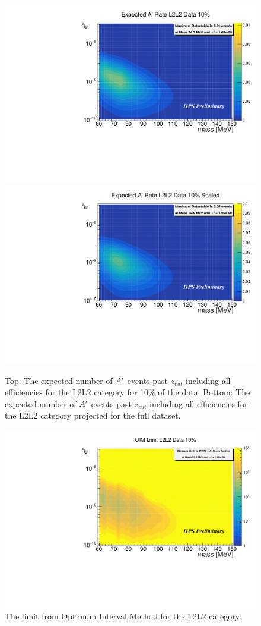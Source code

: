 \begin{figure}[t]
    \centering
\includegraphics[width=.85\textwidth]{figs/Results/ap_rate_L2L2.pdf}
    \includegraphics[width=.85\textwidth]{figs/Results/ap_rate_L2L2_scaled.pdf}
    \caption{Top: The expected number of $A^\prime$ events past $z_{cut}$ including all efficiencies for the L2L2 category for 10\% of the data. Bottom: The expected number of $A^\prime$ events past $z_{cut}$ including all efficiencies for the L2L2 category projected for the full dataset. }
    \label{fig:sigyield_L2L2}
\end{figure}

\begin{figure}[t]
    \centering
    \includegraphics[width=.85\textwidth]{figs/Results/oim_L2L2.pdf}
    \caption{The limit from Optimum Interval Method for the L2L2 category. }
    \label{fig:OIM_L2L2}
\end{figure}

